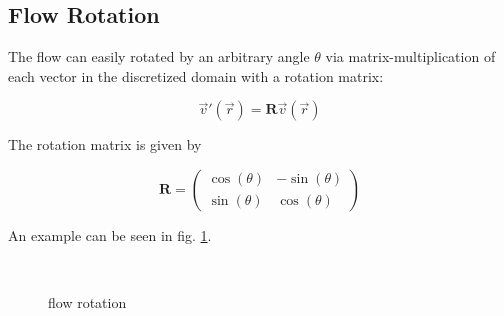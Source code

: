 \documentclass[a4paper,10pt,notitlepage]{scrartcl}
\newcommand{\mat}[1]{\mathbf{#1}}
\begin{document}
\subsection{Flow Rotation}

The flow can easily rotated by an arbitrary angle $\theta$ via
matrix-multiplication of each vector in the discretized domain with a rotation
matrix:

\begin{equation}
 \vec{v}'(\vec{r}) = \mat{R} \vec{v}(\vec{r})
\end{equation}

The rotation matrix is given by

\begin{equation}
 \mat{R} = \left(
\begin{array}{cc}
\cos(\theta) & -\sin(\theta) \\
\sin(\theta) & \cos(\theta) \end{array} \right)
\end{equation}

An example can be seen in fig. \ref{fig:flow-rotation}.

\begin{figure}
  \centering
  \\
  \caption{flow rotation}
  \label{fig:flow-rotation}
\end{figure}
\end{document}
